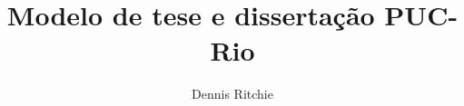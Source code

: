\documentclass[phd,brazilian,digital]{thesispuc}%
\author{Dennis Ritchie}
\title{Modelo de tese e dissertação PUC-Rio} %
\begin{document}
   
  
  
  
  
  \arial
  
\end{document}
